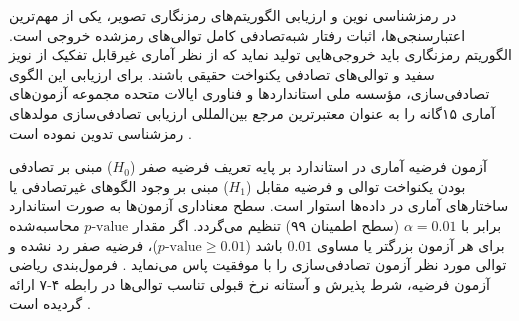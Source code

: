 




در رمزشناسی نوین و ارزیابی الگوریتم‌های رمزنگاری تصویر، یکی از مهم‌ترین اعتبارسنجی‌ها، اثبات رفتار شبه‌تصادفی کامل  توالی‌های رمزشده خروجی است. الگوریتم رمزنگاری باید خروجی‌هایی تولید نماید که از نظر آماری غیرقابل تفکیک از نویز سفید و توالی‌های تصادفی یکنواخت حقیقی باشند. برای ارزیابی این الگوی تصادفی‌سازی، مؤسسه ملی استانداردها و فناوری ایالات متحده  مجموعه آزمون‌های آماری ۱۵گانه  را به عنوان معتبرترین مرجع بین‌المللی ارزیابی تصادفی‌سازی مولدهای رمزشناسی تدوین نموده است .\par



آزمون فرضیه آماری در استاندارد  بر پایه تعریف فرضیه صفر ($H_0$) مبنی بر تصادفی بودن یکنواخت توالی و فرضیه مقابل ($H_1$) مبنی بر وجود الگوهای غیرتصادفی یا ساختارهای آماری در داده‌ها استوار است. سطح معناداری آزمون‌ها به صورت استاندارد برابر با $\alpha = 0.01$ (سطح اطمینان ۹۹) تنظیم می‌گردد. اگر مقدار $p\text{-value}$ محاسبه‌شده برای هر آزمون بزرگتر یا مساوی $0.01$ باشد ($p\text{-value} \ge 0.01$)، فرضیه صفر رد نشده و توالی مورد نظر آزمون تصادفی‌سازی را با موفقیت پاس می‌نماید . فرمول‌بندی ریاضی آزمون فرضیه، شرط پذیرش و آستانه نرخ قبولی تناسب توالی‌ها  در رابطه ۴{-}۷ ارائه گردیده است .\par




